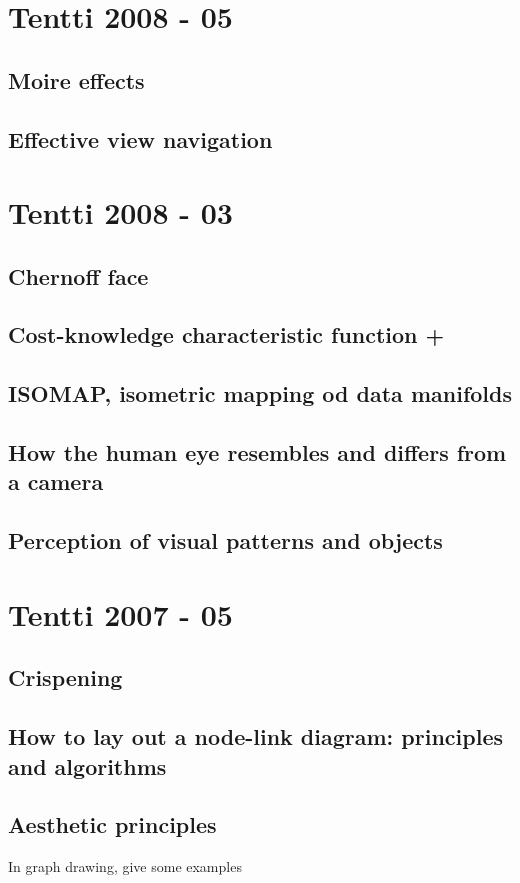 \documentclass[a4paper]{article}
\begin{document}
\section{Tentti 2008 - 05}

\subsection{Moire effects}

\subsection{Effective view navigation}

\section{Tentti 2008 - 03}

\subsection{Chernoff face}

\subsection{Cost-knowledge characteristic function +}

\subsection{ISOMAP, isometric mapping od data manifolds}

\subsection{How the human eye resembles and differs from a camera}

\subsection{Perception of visual patterns and objects}

\section{Tentti 2007 - 05}

\subsection{Crispening}

\subsection{How to lay out a node-link diagram: principles and algorithms}

\subsection{Aesthetic principles}

In graph drawing, give some examples
\end{document}
